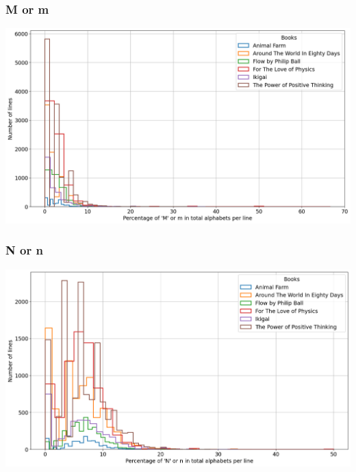 \begin{frame}
    \frametitle{M or m}
    \begin{center}
        \hspace*{-5ex}
        \includegraphics[scale=0.35]{../01_programFiles/histograms/m.png}\hspace{10ex}
    \end{center}
\end{frame}

\begin{frame}
    \frametitle{N or n}
    \begin{center}
        \hspace*{-5ex}
        \includegraphics[scale=0.35]{../01_programFiles/histograms/n.png}\hspace{10ex}
    \end{center}
\end{frame}


